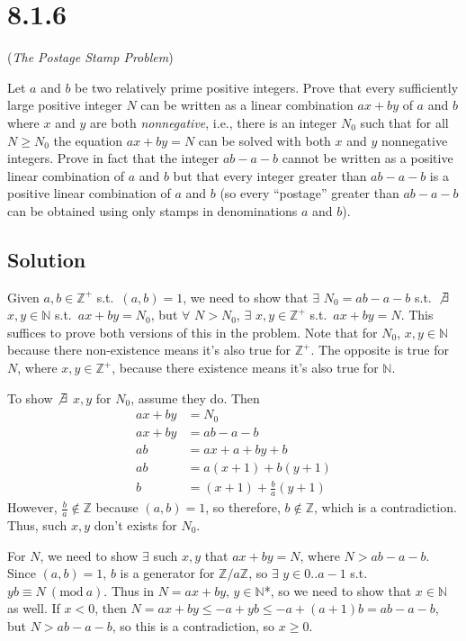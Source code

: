 \documentclass[fleqn]{article}
\newcommand{\Mod}[1]{\ (\mathrm{mod}\ #1)}
\begin{document}
    \section{8.1.6}
    (\textit{The Postage Stamp Problem})
    
    Let $a$ and $b$ be two relatively prime positive integers.  Prove that every sufficiently large positive integer $N$ can be written as a linear combination $ax + by$ of $a$ and $b$ where $x$ and $y$ are both \textit{nonnegative}, i.e., there is an integer $N_0$ such that for all $N \geq N_0$ the equation $ax + by = N$ can be solved with both $x$ and $y$ nonnegative integers.  Prove in fact that the integer $ab - a - b$ cannot be written as a positive linear combination of $a$ and $b$ but that every integer greater than $ab - a - b$ is a positive linear combination of $a$ and $b$ (so every ``postage'' greater than $ab - a - b$ can be obtained using only stamps in denominations $a$ and $b$).
        
        \subsection{Solution}
        Given $a, b \in \mathbb{Z}^+$ s.t.\ $(a, b) = 1$, we need to show that $\exists$ $N_0 = ab - a - b$ s.t.\ $\not\exists$ $x, y \in \mathbb{N}$ s.t.\ $ax + by = N_0$, but $\forall$ $N > N_0$, $\exists$ $x, y \in \mathbb{Z}^+$ s.t.\ $ax + by = N$.  This suffices to prove both versions of this in the problem.  Note that for $N_0$, $x, y \in \mathbb{N}$ because there non-existence means it's also true for $\mathbb{Z}^+$.  The opposite is true for $N$, where $x, y \in \mathbb{Z}^+$, because there existence means it's also true for $\mathbb{N}$.
        
        To show $\not\exists$ $x, y$ for $N_0$, assume they do.  Then
        \begin{align}
            ax + by &= N_0 \\
            ax + by &= ab - a - b \\
            ab &= ax + a + by + b \\
            ab &= a(x + 1) + b(y + 1) \\
            b &= (x + 1) + \frac{b}{a}(y + 1)
        \end{align}
        However, $\frac{b}{a} \notin \mathbb{Z}$ because $(a, b) = 1$, so therefore, $b \notin \mathbb{Z}$, which is a contradiction.  Thus, such $x, y$ don't exists for $N_0$.
        
        For $N$, we need to show $\exists$ such $x, y$ that $ax + by = N$, where $N > ab - a - b$.  Since $(a, b) = 1$, $b$ is a generator for $\mathbb{Z}/a\mathbb{Z}$, so $\exists$ $y \in 0..a - 1$ s.t.\ $yb \equiv N \Mod{a}$.  Thus in $N = ax + by$, $y \in \mathbb{N}$*, so we need to show that $x \in \mathbb{N}$ as well.  If $x < 0$, then $N = ax + by \leq -a + yb \leq -a + (a + 1)b = ab - a - b$, but $N > ab - a - b$, so this is a contradiction, so $x \geq 0$.
        
\end{document}
